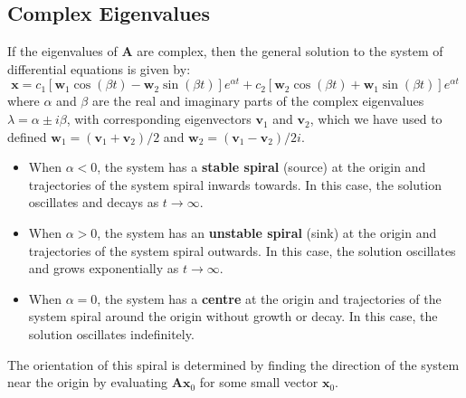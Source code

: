 \documentclass{article}
\begin{document}
\subsection{Complex Eigenvalues}
If the eigenvalues of \(\symbf{A}\) are complex, then the general
solution to the system of differential equations is given by:
\begin{equation*}
    \symbf{x} = c_1 \left[ \symbf{w}_1 \cos\left( \beta t \right) - \symbf{w}_2 \sin\left( \beta t \right) \right] e^{\alpha t} + c_2 \left[ \symbf{w}_2 \cos\left( \beta t \right) + \symbf{w}_1 \sin\left( \beta t \right) \right] e^{\alpha t}
\end{equation*}
where \(\alpha\) and \(\beta\) are the real and imaginary parts of the
complex eigenvalues \(\lambda = \alpha \pm i \beta\), with corresponding
eigenvectors \(\symbf{v}_1\) and \(\symbf{v}_2\), which we have used to
defined \(\symbf{w}_1 = \left( \symbf{v}_1 + \symbf{v}_2 \right) / 2\)
and \(\symbf{w}_2 = \left( \symbf{v}_1 - \symbf{v}_2 \right) / 2i\).
\begin{itemize}
    \item When \(\alpha < 0\), the system has a \textbf{stable spiral}
          (source) at the origin and trajectories of the system spiral
          inwards towards. In this case, the solution oscillates and
          decays as \(t \to \infty\).
    \item When \(\alpha > 0\), the system has an \textbf{unstable
          spiral} (sink) at the origin and trajectories of the system
          spiral outwards. In this case, the solution oscillates and
          grows exponentially as \(t \to \infty\).
    \item When \(\alpha = 0\), the system has a \textbf{centre} at the
          origin and trajectories of the system spiral around the
          origin without growth or decay. In this case, the solution
          oscillates indefinitely.
\end{itemize}
The orientation of this spiral is determined by finding the direction of
the system near the origin by evaluating \(\symbf{A} \symbf{x}_0\)
for some small vector \(\symbf{x}_0\).
\end{document}
